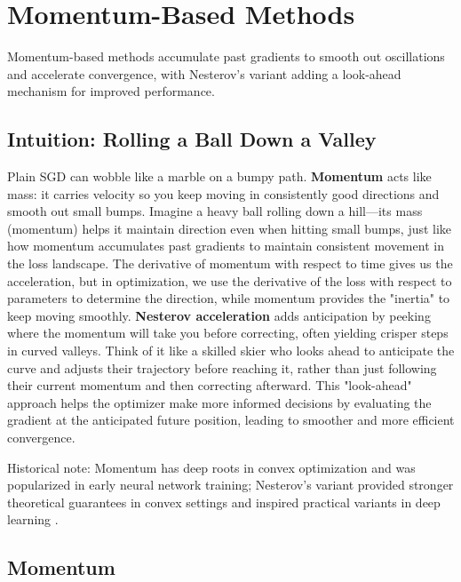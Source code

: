 
\section{Momentum-Based Methods }
\label{sec:momentum}

Momentum-based methods accumulate past gradients to smooth out oscillations and accelerate convergence, with Nesterov's variant adding a look-ahead mechanism for improved performance.

\subsection{Intuition: Rolling a Ball Down a Valley}

Plain SGD can wobble like a marble on a bumpy path. \textbf{Momentum} acts like mass: it carries velocity so you keep moving in consistently good directions and smooth out small bumps. Imagine a heavy ball rolling down a hill—its mass (momentum) helps it maintain direction even when hitting small bumps, just like how momentum accumulates past gradients to maintain consistent movement in the loss landscape. The derivative of momentum with respect to time gives us the acceleration, but in optimization, we use the derivative of the loss with respect to parameters to determine the direction, while momentum provides the "inertia" to keep moving smoothly. \textbf{Nesterov acceleration} adds anticipation by peeking where the momentum will take you before correcting, often yielding crisper steps in curved valleys. Think of it like a skilled skier who looks ahead to anticipate the curve and adjusts their trajectory before reaching it, rather than just following their current momentum and then correcting afterward. This "look-ahead" approach helps the optimizer make more informed decisions by evaluating the gradient at the anticipated future position, leading to smoother and more efficient convergence.

Historical note: Momentum has deep roots in convex optimization and was popularized in early neural network training; Nesterov's variant provided stronger theoretical guarantees in convex settings and inspired practical variants in deep learning \cite{Polyak1964,Nesterov1983,GoodfellowEtAl2016,Bishop2006}.

\subsection{Momentum}

